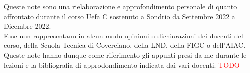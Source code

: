 Queste note sono una rielaborazione e approfondimento personale di quanto affrontato durante il corso Uefa C sostenuto a Sondrio da Settembre 2022 a Dicembre 2022. \hfill \\
Esse non rappresentano in alcun modo opinioni o dichiarazioni dei docenti del corso, della Scuola Tecnica di Coverciano, della LND, della FIGC o dell'AIAC. \hfill \\
Queste note hanno dunque come riferimento gli appunti presi da me durante le lezioni e la bibliografia di approdondimento indicata dai vari docenti.
\textcolor{red}{TODO}
